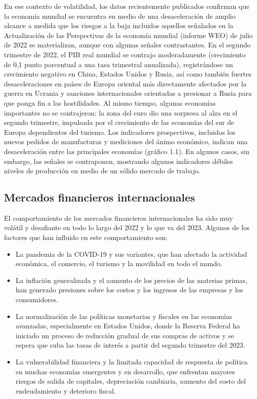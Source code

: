 \documentclass{article}
\theoremstyle{mytheoremstyle}
\theoremstyle{mytheoremstyle}
\theoremstyle{myproblemstyle}
\begin{document}
En ese contexto de volatilidad, los datos recientemente publicados confirman que la economía mundial se encuentra en medio de una desaceleración de amplio alcance a medida que los riesgos a la baja incluidos aquellos señalados en la Actualización de las Perspectivas de la economía mundial (informe WEO) de julio de 2022 se materializan, aunque con algunas señales contrastantes. En el segundo trimestre de 2022, el PIB real mundial se contrajo moderadamente (crecimiento de 0,1 punto porcentual a una tasa trimestral anualizada), registrándose un crecimiento negativo en China, Estados Unidos y Rusia, así como también fuertes desaceleraciones en países de Europa oriental más directamente afectados por la guerra en Ucrania y sanciones internacionales orientadas a presionar a Rusia para que ponga fin a las hostilidades. Al mismo tiempo, algunas economías importantes no se contrajeron: la zona del euro dio una sorpresa al alza en el segundo trimestre, impulsada por el crecimiento de las economías del sur de Europa dependientes del turismo. Los indicadores prospectivos, incluidos los nuevos pedidos de manufacturas y mediciones del ánimo económico, indican una desaceleración entre las principales economías (gráfico 1.1). En algunos casos, sin embargo, las señales se contraponen, mostrando algunos indicadores débiles niveles de producción en medio de un sólido mercado de trabajo.
  \subsection{Mercados financieros internacionales}

 El comportamiento de los mercados financieros internacionales ha sido muy volátil y desafiante en todo lo largo del 2022 y lo que va del 2023. Algunos de los factores que han influido en este comportamiento son:\\
\begin{itemize}
  \item La pandemia de la COVID-19 y sus variantes, que han afectado la actividad económica, el comercio, el turismo y la movilidad en todo el mundo.
  \item La inflación generalizada y el aumento de los precios de las materias primas, han generado presiones sobre los costos y los ingresos de las empresas y los consumidores.
  \item La normalización de las políticas monetarias y fiscales en las economías avanzadas, especialmente en Estados Unidos, donde la Reserva Federal ha iniciado un proceso de reducción gradual de sus compras de activos y se espera que suba las tasas de interés a partir del segundo trimestre del 2023.
  \item La vulnerabilidad financiera y la limitada capacidad de respuesta de política en muchas economías emergentes y en desarrollo, que enfrentan mayores riesgos de salida de capitales, depreciación cambiaria, aumento del costo del endeudamiento y deterioro fiscal.

\end{itemize}
\end{document}

